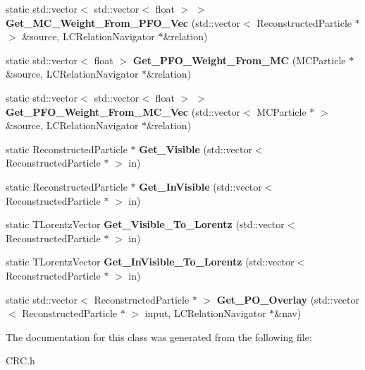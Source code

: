 \begin{DoxyCompactItemize}
\item 
\hypertarget{classToolSet_1_1CRC_aaaca6d608e731f498833598f0c611b34}{
static std::vector$<$ std::vector$<$ float $>$ $>$ {\bfseries Get\_\-MC\_\-Weight\_\-From\_\-PFO\_\-Vec} (std::vector$<$ ReconstructedParticle $\ast$ $>$ \&source, LCRelationNavigator $\ast$\&relation)}
\label{classToolSet_1_1CRC_aaaca6d608e731f498833598f0c611b34}

\item 
\hypertarget{classToolSet_1_1CRC_a384a4d9c72384db38104b6c67b7b6c5d}{
static std::vector$<$ float $>$ {\bfseries Get\_\-PFO\_\-Weight\_\-From\_\-MC} (MCParticle $\ast$\&source, LCRelationNavigator $\ast$\&relation)}
\label{classToolSet_1_1CRC_a384a4d9c72384db38104b6c67b7b6c5d}

\item 
\hypertarget{classToolSet_1_1CRC_acea8182f9deddac046a49604f3fba50b}{
static std::vector$<$ std::vector$<$ float $>$ $>$ {\bfseries Get\_\-PFO\_\-Weight\_\-From\_\-MC\_\-Vec} (std::vector$<$ MCParticle $\ast$ $>$ \&source, LCRelationNavigator $\ast$\&relation)}
\label{classToolSet_1_1CRC_acea8182f9deddac046a49604f3fba50b}

\item 
\hypertarget{classToolSet_1_1CRC_af665bae4e2dea9fbf8f131632ad60986}{
static ReconstructedParticle $\ast$ {\bfseries Get\_\-Visible} (std::vector$<$ ReconstructedParticle $\ast$ $>$ in)}
\label{classToolSet_1_1CRC_af665bae4e2dea9fbf8f131632ad60986}

\item 
\hypertarget{classToolSet_1_1CRC_a09784c243bc4cd8cefb18e00a1d8301f}{
static ReconstructedParticle $\ast$ {\bfseries Get\_\-InVisible} (std::vector$<$ ReconstructedParticle $\ast$ $>$ in)}
\label{classToolSet_1_1CRC_a09784c243bc4cd8cefb18e00a1d8301f}

\item 
\hypertarget{classToolSet_1_1CRC_a52f73ed2ca6accd9fc43f04d9d3cbbe1}{
static TLorentzVector {\bfseries Get\_\-Visible\_\-To\_\-Lorentz} (std::vector$<$ ReconstructedParticle $\ast$ $>$ in)}
\label{classToolSet_1_1CRC_a52f73ed2ca6accd9fc43f04d9d3cbbe1}

\item 
\hypertarget{classToolSet_1_1CRC_ad244840d5374b1773ed3f822d9411a5d}{
static TLorentzVector {\bfseries Get\_\-InVisible\_\-To\_\-Lorentz} (std::vector$<$ ReconstructedParticle $\ast$ $>$ in)}
\label{classToolSet_1_1CRC_ad244840d5374b1773ed3f822d9411a5d}

\item 
\hypertarget{classToolSet_1_1CRC_a4ebcccc808e546491c383b327bcc029d}{
static std::vector$<$ ReconstructedParticle $\ast$ $>$ {\bfseries Get\_\-PO\_\-Overlay} (std::vector$<$ ReconstructedParticle $\ast$ $>$ input, LCRelationNavigator $\ast$\&nav)}
\label{classToolSet_1_1CRC_a4ebcccc808e546491c383b327bcc029d}

\end{DoxyCompactItemize}


The documentation for this class was generated from the following file:\begin{DoxyCompactItemize}
\item 
CRC.h\end{DoxyCompactItemize}
